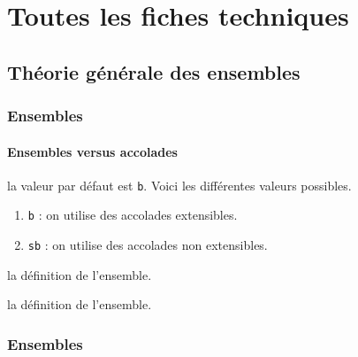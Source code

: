 \documentclass[12pt,a4paper]{book}
\theoremstyle{definition}
\begin{document}
{{\begin{description}
\begin{itemize}[itemsep=.5em]
    \end{itemize}
\end{description}



\newpage
\chapter{Toutes les fiches techniques} \label{techincal-ids}






















\section{Théorie générale des ensembles}

\subsection{Ensembles}

\subsubsection{Ensembles versus accolades}




\IDoption{} la valeur par défaut est \verb+b+.  Voici les différentes valeurs possibles.
\begin{enumerate}
	\item \verb+b+ : on utilise des accolades extensibles.

	\item \verb+sb+ : on utilise des accolades non extensibles.
\end{enumerate}

\IDarg{} la définition de l'ensemble.

\IDarg{} la définition de l'ensemble.




\subsection{Ensembles}

}}
\end{document}
